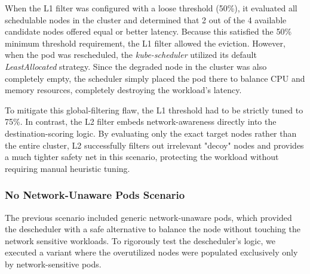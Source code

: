 \begin{table}[H]
    \centering
    \caption{Impact of MinBetterPercentage on L1 Pre-Eviction Filters}
    \label{tab:minbetter_impact}
\end{table}

When the L1 filter was configured with a loose threshold (50\%), it evaluated all schedulable nodes in the cluster and determined that 2 out of the 4 available candidate nodes offered equal or better latency. Because this satisfied the 50\% minimum threshold requirement, the L1 filter allowed the eviction. However, when the pod was rescheduled, the \textit{kube-scheduler} utilized its default \textit{LeastAllocated} strategy. Since the degraded node in the cluster was also completely empty, the scheduler simply placed the pod there to balance CPU and memory resources, completely destroying the workload's latency.

To mitigate this global-filtering flaw, the L1 threshold had to be strictly tuned to 75\%. In contrast, the L2 filter embeds network-awareness directly into the destination-scoring logic. By evaluating only the exact target nodes rather than the entire cluster, L2 successfully filters out irrelevant "decoy" nodes and provides a much tighter safety net in this scenario, protecting the workload without requiring manual heuristic tuning.

\subsubsection{No Network-Unaware Pods Scenario}
\label{sec:no_filler_pods}
The previous scenario included generic network-unaware pods, which provided the descheduler with a safe alternative to balance the node without touching the network sensitive workloads. To rigorously test the descheduler's logic, we executed a variant where the overutilized nodes were populated exclusively only by network-sensitive pods.

